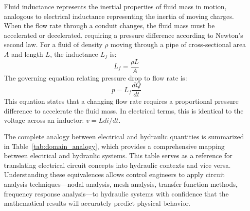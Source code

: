Fluid inductance represents the inertial properties of fluid mass in motion, analogous to electrical inductance representing the inertia of moving charges. When the flow rate through a conduit changes, the fluid mass must be accelerated or decelerated, requiring a pressure difference according to Newton's second law. For a fluid of density $\rho$ moving through a pipe of cross-sectional area $A$ and length $L$, the inductance $L_f$ is:
\begin{equation}
L_f = \frac{\rho L}{A}
\end{equation}
The governing equation relating pressure drop to flow rate is:
\begin{equation}
p = L_f \frac{dQ}{dt}
\end{equation}
This equation states that a changing flow rate requires a proportional pressure difference to accelerate the fluid mass. In electrical terms, this is identical to the voltage across an inductor: $v = L di/dt$.

The complete analogy between electrical and hydraulic quantities is summarized in Table~\ref{tab:domain_analogy}, which provides a comprehensive mapping between electrical and hydraulic systems. This table serves as a reference for translating electrical circuit concepts into hydraulic contexts and vice versa. Understanding these equivalences allows control engineers to apply circuit analysis techniques—nodal analysis, mesh analysis, transfer function methods, frequency response analysis—to hydraulic systems with confidence that the mathematical results will accurately predict physical behavior.

